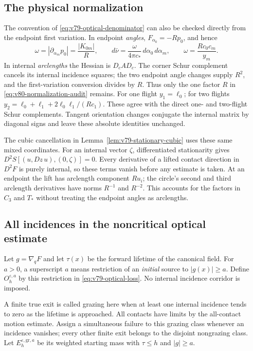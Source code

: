 \subsection{The physical normalization}
The convention of \eqref{eq:v79-optical-denominator} can also be
checked directly from the endpoint first variation. In endpoint
\emph{angles}, $F_{\alpha_0}=-Rp_0$, and hence
\begin{equation}\label{eq:v80-normalization-audit}
 \omega=|\partial_{\alpha_m}p_0|=\frac{|K_{0m}|}{R},\qquad
 d\bar\nu=\frac{\omega}{4\pi c_*}\,d\alpha_0\,d\alpha_m,
 \qquad \omega=\frac{Rc_0c_m}{y_m}.
\end{equation}
In internal \emph{arclengths} the Hessian is $D_cAD_c$.
The corner Schur complement cancels its internal incidence squares;
the two endpoint angle changes supply $R^2$, and the first-variation
conversion divides by $R$. Thus only the one factor $R$ in
\eqref{eq:v80-normalization-audit} remains. For one flight
$y_1=\ell_0$; for two flights
$y_2=\ell_0+\ell_1+2\ell_0\ell_1/(Rc_1)$. These agree with
the direct one- and two-flight Schur complements. Tangent orientation
changes conjugate the internal matrix by diagonal signs and leave
these absolute identities unchanged.

The cubic cancellation in Lemma~\ref{lem:v79-stationary-cubic}
uses these same mixed coordinates. For an internal vector $\zeta$,
differentiated stationarity gives
$D^2S[(u,Dz\,u),(0,\zeta)]=0$. Every derivative of a lifted contact
direction in $D^2F$ is purely internal, so these terms vanish before
any estimate is taken. At an endpoint the lift has arclength component
$R u_i$; the circle's second and third arclength derivatives have
norms $R^{-1}$ and $R^{-2}$. This accounts for the factors in
$C_3$ and $T_*$ without treating the endpoint angles as arclengths.

\subsection{All incidences in the noncritical optical estimate}
Let $g=\nabla_qF$ and let $\tau(x)$ be the forward lifetime of the
canonical field. For $a>0$, a superscript $a$ means restriction of
an \emph{initial} source to $|g(x)|\ge a$. Define
$O_h^{\varepsilon,a}$ by this restriction in
\eqref{eq:v79-optical-loss}. No internal incidence corridor is imposed.

A finite true exit is called grazing here when at least one internal
incidence tends to zero as the lifetime is approached. All contacts
have limits by the all-contact motion estimate. Assign a simultaneous
failure to this grazing class whenever an incidence vanishes; every
other finite exit belongs to the disjoint nongrazing class.
Let $E_h^{\varepsilon,\mathrm{gr},a}$ be its weighted starting mass
with $\tau\le h$ and $|g|\ge a$.

